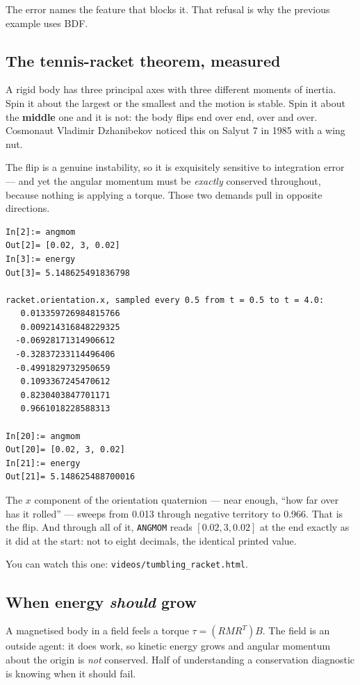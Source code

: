 \documentclass[11pt]{article}
\newcommand{\kw}[1]{\texttt{\uppercase{#1}}}
\newcommand{\code}[1]{\texttt{#1}}
\begin{document}
The error names the feature that blocks it. That refusal is why the
previous example uses BDF.

\subsection{The tennis-racket theorem, measured}

A rigid body has three principal axes with three different moments of
inertia. Spin it about the largest or the smallest and the motion is
stable. Spin it about the \textbf{middle} one and it is not: the body
flips end over end, over and over. Cosmonaut Vladimir Dzhanibekov
noticed this on Salyut 7 in 1985 with a wing nut.

The flip is a genuine instability, so it is exquisitely sensitive to
integration error --- and yet the angular momentum must be
\emph{exactly} conserved throughout, because nothing is applying a
torque. Those two demands pull in opposite directions.

\begin{lstlisting}
In[2]:= angmom
Out[2]= [0.02, 3, 0.02]
In[3]:= energy
Out[3]= 5.148625491836798

racket.orientation.x, sampled every 0.5 from t = 0.5 to t = 4.0:
   0.013359726984815766
   0.009214316848229325
  -0.06928171314906612
  -0.32837233114496406
  -0.4991829732950659
   0.1093367245470612
   0.8230403847701171
   0.9661018228588313

In[20]:= angmom
Out[20]= [0.02, 3, 0.02]
In[21]:= energy
Out[21]= 5.148625488700016
\end{lstlisting}

The $x$ component of the orientation quaternion --- near enough, ``how
far over has it rolled'' --- sweeps from 0.013 through negative
territory to 0.966. That is the flip. And through all of it,
\kw{angmom} reads $[0.02, 3, 0.02]$ at the end exactly as it did at the
start: not to eight decimals, the identical printed value.

You can watch this one: \code{videos/tumbling\_racket.html}.

\subsection{When energy \emph{should} grow}

A magnetised body in a field feels a torque $\tau = (RMR^{T})B$. The
field is an outside agent: it does work, so kinetic energy grows and
angular momentum about the origin is \emph{not} conserved. Half of
understanding a conservation diagnostic is knowing when it should fail.
\end{document}
